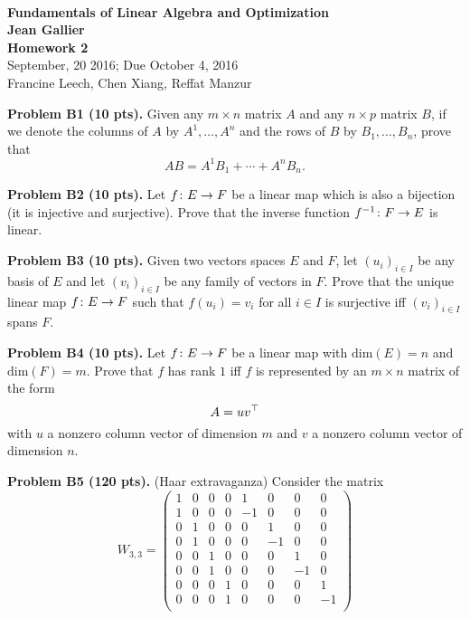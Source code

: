 \documentclass[12pt]{article}
\begin{document}
\begin{center}
\\
\vspace{1cm}
{\Large\bf Fundamentals of Linear Algebra and Optimization\\
Jean Gallier \\
\vspace{0.5cm}
Homework 2}\\[10pt]
September, 20 2016; Due October 4, 2016\\
Francine Leech, Chen Xiang, Reffat Manzur
\end{center}


\vspace {0.25cm}\noindent
{\bf Problem B1 (10 pts).}
Given any $m\times n$ matrix $A$ and any $n\times p$
matrix $B$, if we denote the columns of $A$ by $A^1, \ldots, A^n$
and the rows of $B$ by $B_1, \ldots, B_n$,
prove that
\[
AB = A^1B_1 + \cdots + A^nB_n.
\] 


\vspace {0.25cm}\noindent
{\bf Problem B2 (10 pts).}
Let $f\colon E\rightarrow F$ be a linear map which is also a bijection
(it is injective and surjective). Prove that the inverse function
$f^{-1}\colon F\rightarrow E$ is linear. 


\vspace {0.25cm}\noindent
{\bf Problem B3 (10 pts).}
Given two vectors spaces $E$ and $F$, let $(u_i)_{i\in I}$
be any basis of $E$ and let $(v_i)_{i\in I}$ be any
family of vectors in $F$. Prove that the unique linear map
$f\colon E\rightarrow F$ such that $f(u_i) = v_i$ for all $i\in I$ 
is surjective iff  $(v_i)_{i\in I}$ spans $F$.

\vspace {0.25cm}\noindent
{\bf Problem B4 (10 pts).}
Let $f\colon E\rightarrow F$ be a linear map 
with $\mathrm{dim}(E) = n$ and $\mathrm{dim}(F)  = m$.
Prove that $f$ has rank $1$ iff $f$ is represented by an
$m\times n$ matrix of the form
\[
A = uv^{\top}
\]
with $u$ a nonzero column vector of dimension $m$ and $v$ a 
nonzero column vector  of dimension $n$.



\vspace {0.25cm}\noindent
{\bf Problem B5 (120 pts).} (Haar extravaganza)
Consider the matrix
\[
W_{3, 3} =
\begin{pmatrix}
1  &  0  &  0 & 0 & 1   &  0   & 0    & 0  \\
1  &  0  &  0 & 0 & -1 &  0   & 0    & 0  \\
0   &  1  &  0 & 0 &  0  & 1   & 0    & 0  \\
0   &  1  &  0 & 0 &  0  & -1 & 0    & 0  \\
0   &  0  &  1 & 0 &  0  &  0  & 1    & 0  \\
0   &  0  &  1 & 0 &  0  &  0  & -1  & 0  \\
0   &  0  &  0 & 1 &  0  &  0  & 0    & 1  \\
0   &  0  &  0 & 1 &  0  &  0  & 0    & -1  \\
\end{pmatrix}
\]
\end{document}
